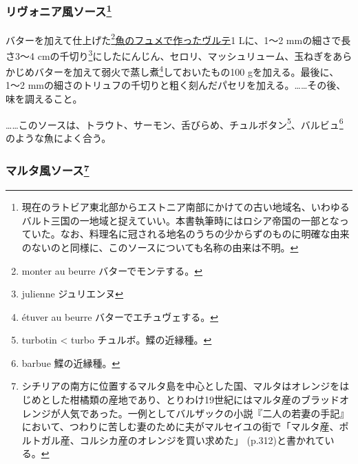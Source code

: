 \begin{recette}
\hypertarget{sauce-livonienne}{%
\subsubsection[リヴォニア風ソース]{\texorpdfstring{リヴォニア風ソース\footnote{現在のラトビア東北部からエストニア南部にかけての古い地域名、いわゆるバルト三国の一地域と捉えていい。本書執筆時にはロシア帝国の一部となっていた。なお、料理名に冠される地名のうちの少からずのものに明確な由来のないのと同様に、このソースについても名称の由来は不明。}}{リヴォニア風ソース}}\label{sauce-livonienne}}



バターを加えて仕上げた\footnote{monter au beurre バターでモンテする。}\protect\hyperlink{veloute-de-poisson}{魚のフュメで作ったヴルテ}1
Lに、1〜2 mmの細さで長さ3〜4 cmの千切り\footnote{julienne ジュリエンヌ}にしたにんじん、セロリ、マッシュリューム、玉ねぎをあらかじめバターを加えて弱火で蒸し煮\footnote{étuver
  au beurre バターでエチュヴェする。}しておいたもの100
gを加える。最後に、1〜2
mmの細さのトリュフの千切りと粗く刻んだパセリを加える。\ldots{}\ldots{}その後、味を調えること。

\ldots{}\ldots{}このソースは、トラウト、サーモン、舌びらめ、チュルボタン\footnote{turbotin
  \textless{} turbo チュルボ。鰈の近縁種。}、バルビュ\footnote{barbue
  鰈の近縁種。}のような魚によく合う。

\hypertarget{sauce-maltaise}{%
\subsubsection[マルタ風ソース]{\texorpdfstring{マルタ風ソース\footnote{シチリアの南方に位置するマルタ島を中心とした国、マルタはオレンジをはじめとした柑橘類の産地であり、とりわけ19世紀にはマルタ産のブラッドオレンジが人気であった。一例としてバルザックの小説『二人の若妻の手記』において、つわりに苦しむ妻のために夫がマルセイユの街で「マルタ産、ポルトガル産、コルシカ産のオレンジを買い求めた」
  (p.312)と書かれている。}}{マルタ風ソース}}\label{sauce-maltaise}}



\end{recette}
